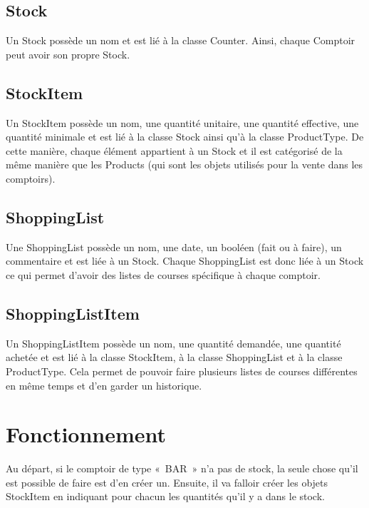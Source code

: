 \documentclass[a4paper]{report}
\begin{document}
\subsection{Stock}
\par Un Stock possède un nom et est lié à la classe Counter. Ainsi, chaque Comptoir peut avoir son propre Stock.

\subsection{StockItem}
\par Un StockItem possède un nom, une quantité unitaire, une quantité effective, une quantité minimale et est lié à la classe Stock ainsi qu’à la classe ProductType. De cette manière, chaque élément appartient à un Stock et il est catégorisé de la même manière que les Products (qui sont les objets utilisés pour la vente dans les comptoirs). 

\subsection{ShoppingList}
\par Une ShoppingList possède un nom, une date, un booléen (fait ou à faire), un commentaire et est liée à un Stock. Chaque ShoppingList est donc liée à un Stock ce qui permet d’avoir des listes de courses spécifique à chaque comptoir.

\subsection{ShoppingListItem}
\par Un ShoppingListItem possède un nom, une quantité demandée, une quantité achetée et est lié à la classe StockItem, à la classe ShoppingList et à la classe ProductType. Cela permet de pouvoir faire plusieurs listes de courses différentes en même temps et d’en garder un historique.

\section{Fonctionnement}
\label{sec:fonctionnement}

\par Au départ, si le comptoir de type « BAR » n’a pas de stock, la seule chose qu’il est possible de faire est d’en créer un. Ensuite, il va falloir créer les objets StockItem en indiquant pour chacun les quantités qu’il y a dans le stock.
    
\end{document}
